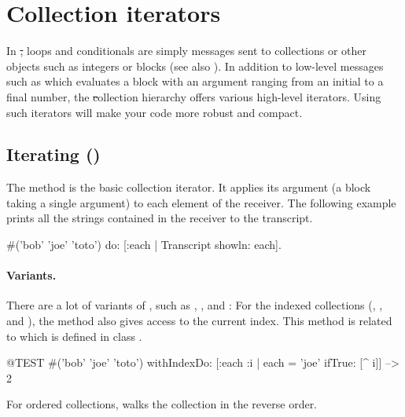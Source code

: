 \documentclass[a4paper,10pt,twoside]{book}
\begin{document}
\section{Collection iterators}
\label{sec:iterators}

In \st, loops and conditionals are simply messages sent to collections or other objects such as integers or blocks (see also ).
In addition to low-level messages such as  which evaluates a block with an argument ranging from an initial to a final number, the \st collection hierarchy offers various high-level iterators.
Using such iterators will make your code more robust and compact.

\subsection{Iterating ()}
The method  is the basic collection iterator.
It applies its argument (a block taking a single argument) to each element of the receiver.
The following example prints all the strings contained in the receiver to the transcript.

\begin{code}{}
#('bob' 'joe' 'toto') do: [:each | Transcript showln: each].
\end{code}

\paragraph{Variants.}
There are a lot of variants of , such as \mbox{,} \mbox{}, and :
For the indexed collections (, , and ), the method  also gives access to the current index.
This method is related to  which is defined in class .

\begin{code}{@TEST}
#('bob' 'joe' 'toto') withIndexDo: [:each :i | each = 'joe' ifTrue: [^ i]] --> 2
\end{code}

For ordered collections,  walks the collection in the reverse order.
\end{document}
